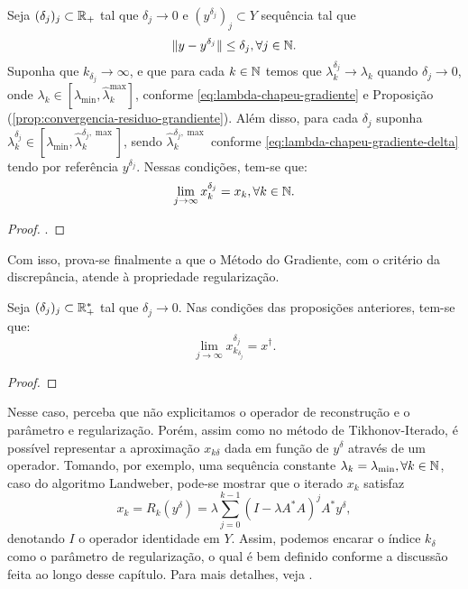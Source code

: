 \begin{prop}
    Seja $(\delta_j)_j\subset \mathbb{R}_+$ tal que $\delta_j \to 0$ e $(y^{\delta_j})_j\subset Y$ sequência tal que
    \[
        \| y - y^{\delta_j}\| \leq \delta_j, \forall j \in \mathbb N.
    \]
    Suponha que $k_{\delta_j} \to \infty$, e que para cada $k\in \mathbb N$ temos que $\lambda_k^{\delta_j} \to \lambda_k$ quando $\delta_j \to 0$, onde $\lambda_k\in [\lambda_{\min}, \hat\lambda_k^{\max}]$, conforme \eqref{eq:lambda-chapeu-gradiente} e Proposição (\ref{prop:convergencia-residuo-grandiente}). Além disso, para cada $\delta_j$ suponha $\lambda_k^{\delta_j}\in [\lambda_{\min}, \hat\lambda_k^{\delta_j, \max}]$, sendo $\hat\lambda_k^{\delta_j, \max}$ conforme \eqref{eq:lambda-chapeu-gradiente-delta} tendo por referência $y^{\delta_j}$.
    Nessas condições, tem-se que:
    \[
        \lim_{j\to\infty} x_k^{\delta_j} = x_k, \forall k \in \mathbb N.
    \]
\end{prop}
\begin{proof}
    .
\end{proof}

Com isso, prova-se finalmente a que o Método do Gradiente, com o critério da discrepância, atende à propriedade regularização.

\begin{prop}
    Seja $(\delta_j)_j \subset \mathbb{R}_+^*$ tal que $\delta_j \to 0$. Nas condições das proposições anteriores, tem-se que:
    \[
        \lim_{j \to \infty} x_{k_{\delta_j}}^{\delta_j} = x^\dag.
    \]
\end{prop}
\begin{proof}
\end{proof}
\begin{obs}
    Nesse caso, perceba que não explicitamos o operador de reconstrução e o parâmetro e regularização. Porém, assim como no método de Tikhonov-Iterado, é possível representar a aproximação $x_{k\delta}$ dada em função de $y^\delta$ através de um operador. Tomando, por exemplo, uma sequência constante $\lambda_k = \lambda_{\min}, \forall k \in \mathbb N$, caso do algoritmo Landweber, pode-se mostrar que o iterado $x_k$ satisfaz
    \[
        x_k = R_k(y^\delta) = \lambda\sum_{j=0}^{k-1}(I - \lambda A^*A)^j A^*y^\delta,
    \]
    denotando $I$ o operador identidade em $Y$. Assim, podemos encarar o índice $k_\delta$ como o parâmetro de regularização, o qual é bem definido conforme a discussão feita ao longo desse capítulo. Para mais detalhes, veja \cite{kirsch}.
\end{obs}

